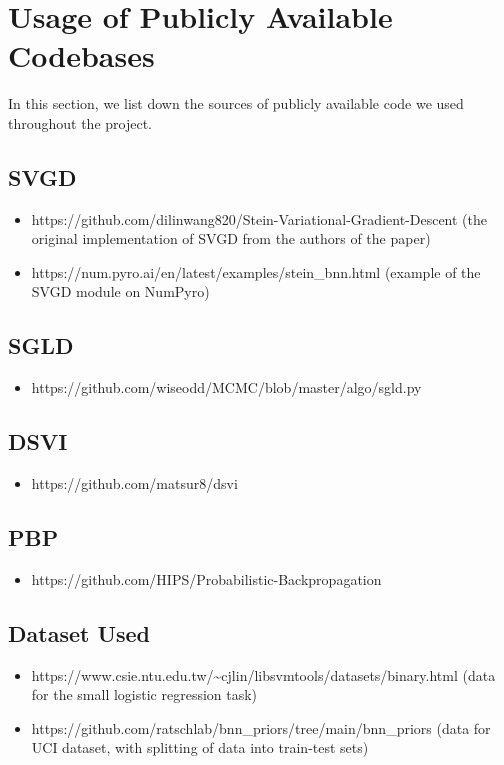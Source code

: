 \section{Usage of Publicly Available Codebases}
In this section, we list down the sources of publicly available code we used throughout the project.
\subsection{SVGD}
\begin{itemize}
    \item https://github.com/dilinwang820/Stein-Variational-Gradient-Descent (the original implementation of SVGD from the authors of the paper)
    \item https://num.pyro.ai/en/latest/examples/stein\_bnn.html (example of the SVGD module on NumPyro)
\end{itemize}

\subsection{SGLD}
\begin{itemize}
    \item https://github.com/wiseodd/MCMC/blob/master/algo/sgld.py
\end{itemize}

\subsection{DSVI}
\begin{itemize}
    \item https://github.com/matsur8/dsvi
\end{itemize}

\subsection{PBP}
\begin{itemize}
    \item https://github.com/HIPS/Probabilistic-Backpropagation
\end{itemize}

\subsection{Dataset Used}
\begin{itemize}
    \item https://www.csie.ntu.edu.tw/\textasciitilde cjlin/libsvmtools/datasets/binary.html (data for the small logistic regression task)
    
    \item https://github.com/ratschlab/bnn\_priors/tree/main/bnn\_priors (data for UCI dataset, with splitting of data into train-test sets)
\end{itemize}